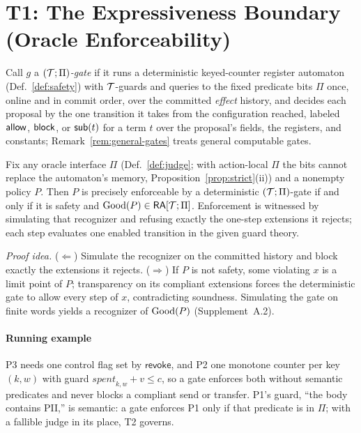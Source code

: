 \section{\texorpdfstring{T1: The Expressiveness Boundary\\(Oracle Enforceability)}{T1: The Expressiveness Boundary (Oracle Enforceability)}}\label{sec:t1}

Call $g$ a \emph{$(\mathcal{T};\Pi)$-gate} if it runs a deterministic keyed-counter register automaton
(Def.~\ref{def:safety}) with $\mathcal{T}$-guards and queries to the fixed predicate bits $\Pi$ once, online
and in commit order, over the committed \emph{effect} history, and decides each proposal by the one
transition it takes from the configuration reached, labeled $\mathsf{allow}$, $\mathsf{block}$, or $\mathsf{sub}(t)$ for a
term $t$ over the proposal's fields, the registers, and constants;
Remark~\ref{rem:general-gates} treats general computable gates.

\begin{theorem}\label{thm:t1}
Fix any oracle interface $\Pi$ (Def.~\ref{def:judge}; with action-local $\Pi$ the bits cannot replace the automaton's memory, Proposition~\ref{prop:strict}(ii)) and a nonempty policy $P$. Then $P$ is precisely enforceable
by a deterministic $(\mathcal{T};\Pi)$-gate if and only if it is safety and
$\mathrm{Good}(P)\in\mathsf{RA}[\mathcal{T};\Pi]$. Enforcement is witnessed by simulating that recognizer
and refusing exactly the one-step extensions it rejects; each step evaluates one
enabled transition in the given guard theory.
\end{theorem}

\noindent\emph{Proof idea.} ($\Leftarrow$) Simulate the recognizer on the committed history and
block exactly the extensions it rejects. ($\Rightarrow$) If $P$ is not safety, some violating
$x$ is a limit point of $P$; transparency on its compliant extensions forces the deterministic
gate to allow every step of $x$, contradicting soundness. Simulating the gate on finite words
yields a recognizer of $\mathrm{Good}(P)$ (Supplement~A.2).

\paragraph{Running example}
P3 needs one control flag set by $\mathsf{revoke}$, and P2 one monotone counter per
key $(k,w)$ with guard $\mathit{spent}_{k,w}+v\le c$, so a gate enforces both
without semantic predicates and never blocks a compliant send or transfer. P1's
guard, ``the body contains PII,'' is semantic: a gate enforces P1 only if that
predicate is in $\Pi$; with a fallible judge in its place, T2 governs.

